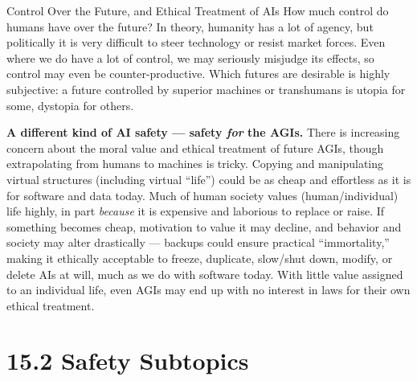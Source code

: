 \documentclass[aspectratio=169,10pt]{beamer}
\begin{document}
\begin{frame}{Control Over the Future, and Ethical Treatment of AIs}
  How much control do humans have over the future? In theory, humanity
  has a lot of agency, but politically it is very difficult to steer
  technology or resist market forces. Even where we do have a lot of
  control, we may seriously misjudge its effects, so control may even be
  counter-productive. Which futures are desirable is highly subjective: a
  future controlled by superior machines or transhumans is utopia for
  some, dystopia for others.

  \vspace{0.4em}
  \textbf{A different kind of AI safety --- safety \emph{for} the AGIs.}
  There is increasing concern about the moral value and ethical treatment
  of future AGIs, though extrapolating from humans to machines is tricky.
  Copying and manipulating virtual structures (including virtual ``life'')
  could be as cheap and effortless as it is for software and data today.
  Much of human society values (human/individual) life highly, in part
  \emph{because} it is expensive and laborious to replace or raise. If
  something becomes cheap, motivation to value it may decline, and
  behavior and society may alter drastically --- backups could ensure
  practical ``immortality,'' making it ethically acceptable to freeze,
  duplicate, slow/shut down, modify, or delete AIs at will, much as we do
  with software today. With little value assigned to an individual life,
  even AGIs may end up with no interest in laws for their own ethical
  treatment.
\end{frame}

\section{15.2 Safety Subtopics}
\end{document}
